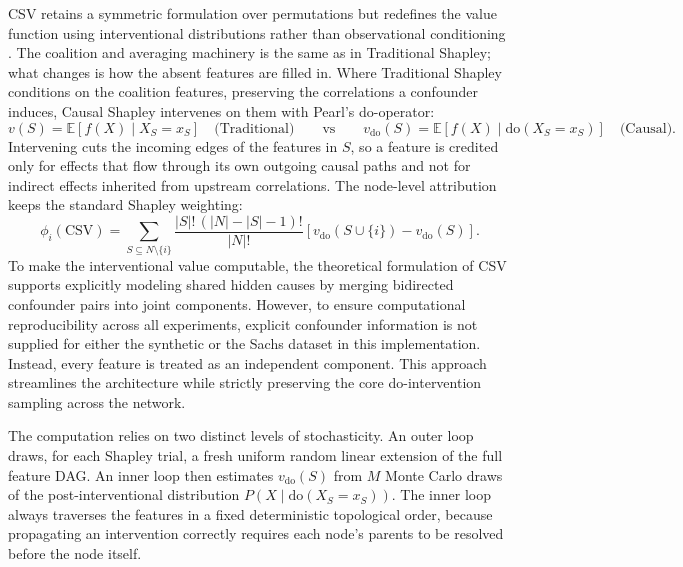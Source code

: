 \documentclass[12pt,a4paper,oneside]{article}
\begin{document}
CSV retains a symmetric formulation over permutations but redefines the value function using interventional distributions rather than observational conditioning \citep{Heskes2020}. The coalition and averaging machinery is the same as in Traditional Shapley; what changes is how the absent features are filled in. Where Traditional Shapley conditions on the coalition features, preserving the correlations a confounder induces, Causal Shapley intervenes on them with Pearl's do-operator:
\begin{equation}
  v(S) = \mathbb{E}[f(X) \mid X_S = x_S] \quad \text{(Traditional)}
  \qquad \text{vs} \qquad
  v_{\mathrm{do}}(S) = \mathbb{E}[f(X) \mid \mathrm{do}(X_S = x_S)] \quad \text{(Causal).}
\end{equation}
Intervening cuts the incoming edges of the features in $S$, so a feature is credited only for effects that flow through its own outgoing causal paths and not for indirect effects inherited from upstream correlations. The node-level attribution keeps the standard Shapley weighting:
\begin{equation}
  \phi_i(\mathrm{CSV}) = \sum_{S \subseteq N \setminus \{i\}} \frac{|S|!\,(|N|-|S|-1)!}{|N|!}
  \left[ v_{\mathrm{do}}(S \cup \{i\}) - v_{\mathrm{do}}(S) \right].
\end{equation}
To make the interventional value computable, the theoretical formulation of CSV supports explicitly modeling shared hidden causes by merging bidirected confounder pairs into joint components. However, to ensure computational reproducibility across all experiments, explicit confounder information is not supplied for either the synthetic or the Sachs dataset in this implementation. Instead, every feature is treated as an independent component. This approach streamlines the architecture while strictly preserving the core do-intervention sampling across the network.

The computation relies on two distinct levels of stochasticity. An outer loop draws, for each Shapley trial, a fresh uniform random linear extension of the full feature DAG. An inner loop then estimates $v_{\mathrm{do}}(S)$ from $M$ Monte Carlo draws of the post-interventional distribution $P(X \mid \mathrm{do}(X_S = x_S))$. The inner loop always traverses the features in a fixed deterministic topological order, because propagating an intervention correctly requires each node's parents to be resolved before the node itself.
\end{document}
